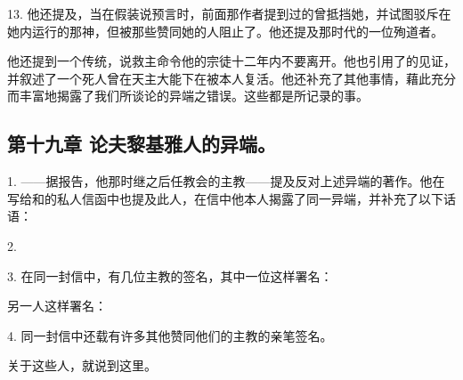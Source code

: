 13. 他还提及，当在假装说预言时，前面那作者提到过的曾抵挡她，并试图驳斥在她内运行的那神，但被那些赞同她的人阻止了。他还提及那时代的一位殉道者。\par

他还提到一个传统，说救主命令他的宗徒十二年内不要离开。他也引用了的见证，并叙述了一个死人曾在天主大能下在被本人复活。他还补充了其他事情，藉此充分而丰富地揭露了我们所谈论的异端之错误。这些都是所记录的事。\par


\subsection{第十九章 论夫黎基雅人的异端。}

1. ——据报告，他那时继之后任教会的主教——提及反对上述异端的著作。他在写给和的私人信函中也提及此人，在信中他本人揭露了同一异端，并补充了以下话语：\par

2. \par

3. 在同一封信中，有几位主教的签名，其中一位这样署名：\par

\par

另一人这样署名：\par

\par

4. 同一封信中还载有许多其他赞同他们的主教的亲笔签名。\par

关于这些人，就说到这里。\par


